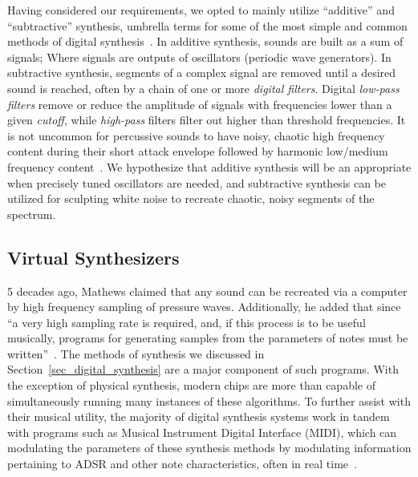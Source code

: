 \documentclass[\main/thesis.tex]{subfiles}
\begin{document}
Having considered our requirements, we opted to mainly utilize \enquote{additive} and \enquote{subtractive} synthesis, umbrella terms for some of the most simple and common methods of digital synthesis~\cite{mitchell2009basicsynthChap1}. 
In additive synthesis, sounds are built as a sum of signals; Where signals are outputs of oscillators (periodic wave generators).  In subtractive synthesis, segments of a complex signal are removed until a desired sound is reached, often by a chain of one or more \textit{digital filters}. Digital \textit{low-pass filters} remove or reduce the amplitude of signals with frequencies lower than a given \textit{cutoff}, while \textit{high-pass} filters filter out higher than threshold frequencies. It is not uncommon for percussive sounds to have noisy, chaotic high frequency content during their short attack envelope followed by harmonic low/medium frequency content~\cite{lakatos2000common}. We hypothesize that additive synthesis will be an appropriate when precisely tuned oscillators are needed, and subtractive synthesis can be utilized for sculpting white noise to recreate chaotic, noisy segments of the spectrum. 



\subsection{Virtual Synthesizers}
5 decades ago, Mathews claimed that any sound can be recreated via a computer by high frequency sampling of pressure waves. Additionally, he added that since \enquote{a very high sampling rate is required, and, if this process is to be useful musically, programs for generating samples from the parameters of notes must be written}~\cite{mathews1963digital}. The methods of synthesis we discussed in Section~\ref{sec_digital_synthesis} are a major component of such programs. With the exception of physical synthesis, modern chips are more than capable of simultaneously running many instances of these algorithms. To further assist with their musical utility, the majority of digital synthesis systems work in tandem with programs such as Musical Instrument Digital Interface (MIDI), which can  modulating the parameters of these synthesis methods by modulating information pertaining to ADSR and other note characteristics, often in real time~\cite{moog1986midi}.  
\end{document}
